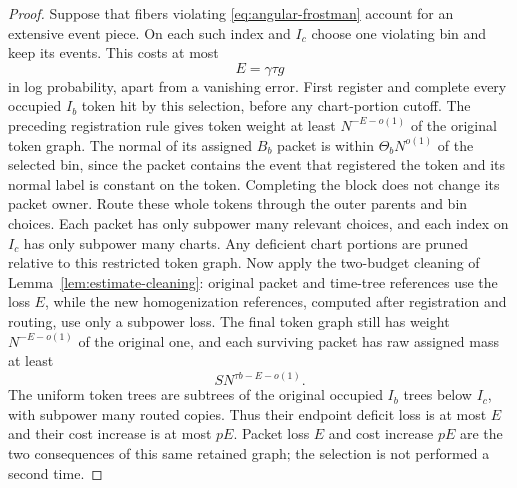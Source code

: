 \begin{proof}
Suppose that fibers violating \eqref{eq:angular-frostman} account for
an extensive event piece. On each such index and $I_c$ choose one
violating bin and keep its events. This costs at most
\[
 E=\gamma\tau g
\]
in log probability, apart from a vanishing error. First register and complete every occupied $I_b$ token hit by this
selection, before any chart-portion cutoff. The preceding registration
rule gives token weight at least $N^{-E-o(1)}$ of the original token
graph. The normal of its assigned $B_b$ packet is within
$\Theta_bN^{o(1)}$ of the selected bin, since the packet contains the
event that registered the token and its normal label is constant on
the token. Completing the block does not change its packet owner.
Route these whole tokens through the outer parents and bin choices.
Each packet has only subpower many relevant choices, and each index
on $I_c$ has only subpower many charts. Any deficient chart portions
are pruned relative to this restricted token graph. Now apply the
two-budget cleaning of Lemma~\ref{lem:estimate-cleaning}: original
packet and time-tree references use the loss $E$, while the new
homogenization references, computed after registration and routing,
use only a subpower loss. The final token graph still has weight
$N^{-E-o(1)}$ of the original one, and each surviving packet has raw
assigned mass at least
\begin{equation}
 SN^{\tau b-E-o(1)}.
\label{eq:angular-selected-packet}
\end{equation}
The uniform token trees are subtrees of the original occupied
$I_b$ trees below $I_c$, with subpower many routed copies. Thus their
endpoint deficit loss is at most $E$ and their cost increase is at
most $pE$. Packet loss $E$ and cost increase $pE$ are the two
consequences of this same retained graph; the selection is not
performed a second time.


\end{proof}
